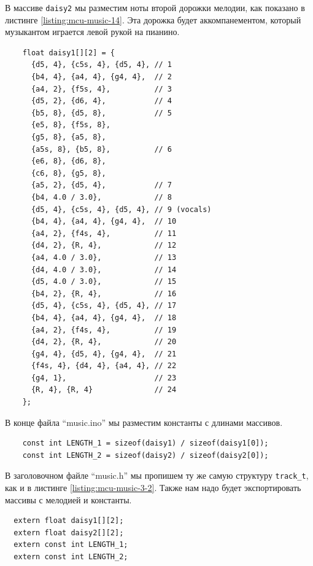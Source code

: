 \documentclass[../sparc.tex]{subfiles}
\begin{document}
В массиве \texttt{daisy2} мы разместим ноты второй дорожки мелодии, как
показано в листинге \ref{listing:mcu-music-14}.  Эта дорожка будет
аккомпанементом, который музыкантом играется левой рукой на пианино.

\begin{listing}[ht]
  \begin{verbatim}
    float daisy1[][2] = {
      {d5, 4}, {c5s, 4}, {d5, 4}, // 1
      {b4, 4}, {a4, 4}, {g4, 4},  // 2
      {a4, 2}, {f5s, 4},          // 3
      {d5, 2}, {d6, 4},           // 4
      {b5, 8}, {d5, 8},           // 5
      {e5, 8}, {f5s, 8},
      {g5, 8}, {a5, 8},
      {a5s, 8}, {b5, 8},          // 6
      {e6, 8}, {d6, 8},
      {c6, 8}, {g5, 8},
      {a5, 2}, {d5, 4},           // 7
      {b4, 4.0 / 3.0},            // 8
      {d5, 4}, {c5s, 4}, {d5, 4}, // 9 (vocals)
      {b4, 4}, {a4, 4}, {g4, 4},  // 10
      {a4, 2}, {f4s, 4},          // 11
      {d4, 2}, {R, 4},            // 12
      {a4, 4.0 / 3.0},            // 13
      {d4, 4.0 / 3.0},            // 14
      {d5, 4.0 / 3.0},            // 15
      {b4, 2}, {R, 4},            // 16
      {d5, 4}, {c5s, 4}, {d5, 4}, // 17
      {b4, 4}, {a4, 4}, {g4, 4},  // 18
      {a4, 2}, {f4s, 4},          // 19
      {d4, 2}, {R, 4},            // 20
      {g4, 4}, {d5, 4}, {g4, 4},  // 21
      {f4s, 4}, {d4, 4}, {a4, 4}, // 22
      {g4, 1},                    // 23
      {R, 4}, {R, 4}              // 24
    };
  \end{verbatim}
  \caption{Массив с нотами для второй дорожки мелодии ``Daisy Bell''.}
  \label{listing:mcu-music-14}
\end{listing}

В конце файла ``music.ino'' мы разместим константы с длинами массивов.

\begin{listing}[H]
  \begin{verbatim}
    const int LENGTH_1 = sizeof(daisy1) / sizeof(daisy1[0]);
    const int LENGTH_2 = sizeof(daisy2) / sizeof(daisy2[0]);
  \end{verbatim}
  \caption{Длины массивов с нотами мелодии ``Daisy Bell''.}
  \label{listing:mcu-music-15}
\end{listing}

В заголовочном файле ``music.h'' мы пропишем ту же самую структуру
\texttt{track_t}, как и в листинге \ref{listing:mcu-music-3-2}.  Также
нам надо будет экспортировать массивы с мелодией и константы.

\begin{verbatim}
  extern float daisy1[][2];
  extern float daisy2[][2];
  extern const int LENGTH_1;
  extern const int LENGTH_2;
\end{verbatim}
\end{document}

